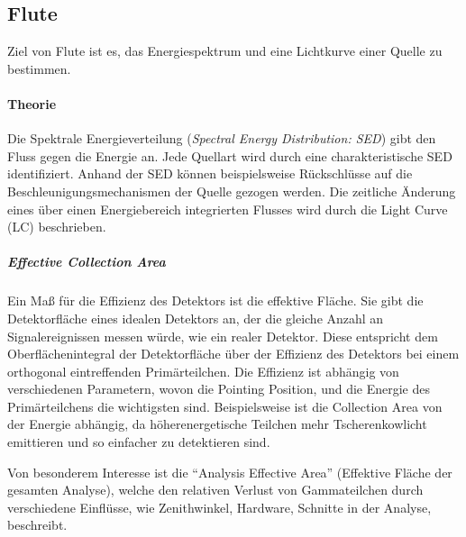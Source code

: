 \subsection{Flute}%
\label{sub:flute}

Ziel von Flute ist es,
das Energiespektrum und
eine Lichtkurve einer Quelle zu bestimmen.

\paragraph{Theorie}%

Die
Spektrale Energieverteilung (\textit{Spectral Energy Distribution: SED})
gibt den Fluss gegen die Energie an.
Jede Quellart wird durch eine charakteristische SED identifiziert.
Anhand der SED können beispielsweise Rückschlüsse auf die
Beschleunigungsmechanismen der Quelle gezogen werden.
Die zeitliche Änderung eines über einen Energiebereich integrierten Flusses wird durch die Light Curve (LC) beschrieben.

\subparagraph{Effective Collection Area}
Ein Maß für die Effizienz des Detektors ist die effektive Fläche.
Sie gibt die Detektorfläche eines idealen Detektors an,
der die gleiche Anzahl an Signalereignissen messen würde,
wie ein realer Detektor.
Diese entspricht dem Oberflächenintegral der Detektorfläche
über der Effizienz des Detektors
bei einem orthogonal eintreffenden Primärteilchen.
Die Effizienz ist abhängig von verschiedenen Parametern,
wovon die Pointing Position,
und die Energie des Primärteilchens
die wichtigsten sind.
Beispielsweise ist die Collection Area von der Energie abhängig,
da höherenergetische Teilchen mehr Tscherenkowlicht emittieren
und so einfacher zu detektieren sind.

Von besonderem Interesse ist die \enquote{Analysis Effective Area}
(Effektive Fläche der gesamten Analyse),
welche den relativen Verlust von Gammateilchen durch verschiedene
Einflüsse, wie Zenithwinkel, Hardware, Schnitte in der Analyse,
beschreibt.

